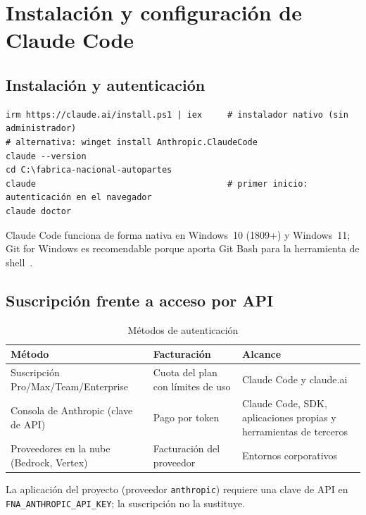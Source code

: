 \chapter{Instalación y configuración de Claude Code}\label{cap:claudecode}

\section{Instalación y autenticación}
\begin{lstlisting}[style=ps]
irm https://claude.ai/install.ps1 | iex     # instalador nativo (sin administrador)
# alternativa: winget install Anthropic.ClaudeCode
claude --version
cd C:\fabrica-nacional-autopartes
claude                                      # primer inicio: autenticación en el navegador
claude doctor
\end{lstlisting}
Claude Code funciona de forma nativa en Windows~10 (1809+) y Windows~11; Git for Windows es recomendable porque
aporta Git Bash para la herramienta de shell~\cite{claude-code}.

\section{Suscripción frente a acceso por API}
\begin{table}[H]\centering\small
\caption{Métodos de autenticación}\label{tab:auth}
\begin{tabularx}{\linewidth}{@{}l X X@{}}\toprule
Método & Facturación & Alcance\\\midrule
Suscripción Pro/Max/Team/Enterprise & Cuota del plan con límites de uso & Claude Code y claude.ai\\
Consola de Anthropic (clave de API) & Pago por token & Claude Code, SDK, aplicaciones propias y herramientas de terceros\\
Proveedores en la nube (Bedrock, Vertex) & Facturación del proveedor & Entornos corporativos\\\bottomrule
\end{tabularx}
\end{table}
La aplicación del proyecto (proveedor \texttt{anthropic}) requiere una clave de API en
\texttt{FNA\_ANTHROPIC\_API\_KEY}; la suscripción no la sustituye.

